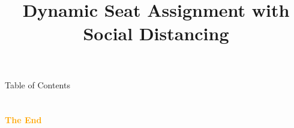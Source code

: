 \documentclass[aspectratio=43]{beamer}
\title{Dynamic Seat Assignment with Social Distancing} %
\subtitle{}
\institute[HKUST]{
    IEDA%
    \\%
    The Hong Kong University of Science and Technology%
} %
\date{}
\begin{document}
    \frame{\titlepage}
    \begin{frame}{Table of Contents}
        \tableofcontents
    \end{frame}
    
    
    
    
    


    \section{}
    \begin{frame}{}
        \centering
            \Huge\bfseries
        \textcolor{orange}{The End}
    \end{frame}
\end{document}
